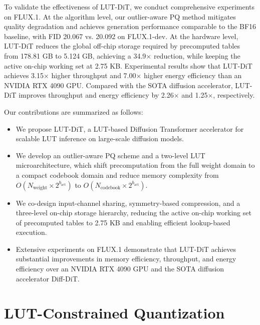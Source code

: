 To validate the effectiveness of LUT-DiT, we conduct comprehensive experiments on FLUX.1. At the algorithm level, our outlier-aware PQ method mitigates quality degradation and achieves generation performance comparable to the BF16 baseline, with FID 20.067 vs. 20.092 on FLUX.1-dev. At the hardware level, LUT-DiT reduces the global off-chip storage required by precomputed tables from 178.81 GB to 5.124 GB, achieving a 34.9$\times$ reduction, while keeping the active on-chip working set at 2.75 KB. Experimental results show that LUT-DiT achieves 3.15$\times$ higher throughput and 7.00$\times$ higher energy efficiency than an NVIDIA RTX 4090 GPU. Compared with the SOTA diffusion accelerator, LUT-DiT improves throughput and energy efficiency by 2.26$\times$ and 1.25$\times$, respectively.

Our contributions are summarized as follows:
\begin{itemize}
\item We propose LUT-DiT, a LUT-based Diffusion Transformer accelerator for scalable LUT inference on large-scale diffusion models.
\item We develop an outlier-aware PQ scheme and a two-level LUT microarchitecture, which shift precomputation from the full weight domain to a compact codebook domain and reduce memory complexity from $O(N_{\text{weight}} \times 2^{b_{\text{act}}})$ to $O(N_{\text{codebook}} \times 2^{b_{\text{act}}})$.
\item We co-design input-channel sharing, symmetry-based compression, and a three-level on-chip storage hierarchy, reducing the active on-chip working set of precomputed tables to 2.75 KB and enabling efficient lookup-based execution.
\item Extensive experiments on FLUX.1 demonstrate that LUT-DiT achieves substantial improvements in memory efficiency, throughput, and energy efficiency over an NVIDIA RTX 4090 GPU and the SOTA diffusion accelerator Diff-DiT.
\end{itemize}

\section{LUT-Constrained Quantization}
\label{sec:quantization}

